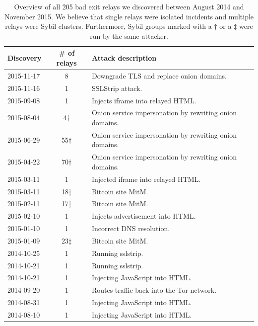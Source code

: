 \begin{table}[t]
\centering
\begin{tabular}{l c p{4cm}}
\textbf{Discovery} & \textbf{\# of relays} & \textbf{Attack description} \\
\hline
2015-11-17 & 8 & Downgrade TLS and replace onion domains. \\
2015-11-16 & 1 & SSLStrip attack. \\
2015-09-08 & 1 & Injects iframe into relayed HTML. \\
2015-08-04 & 4$\dagger$ & Onion service impersonation by rewriting onion domains. \\
2015-06-29 & 55$\dagger$ & Onion service impersonation by rewriting onion domains. \\
2015-04-22 & 70$\dagger$ & Onion service impersonation by rewriting onion domains. \\
2015-03-11 & 1 & Injected iframe into relayed HTML. \\
2015-03-11 & 18$\ddagger$ & Bitcoin site MitM. \\
2015-02-11 & 17$\ddagger$ & Bitcoin site MitM. \\
2015-02-10 & 1 & Injects advertisement into HTML. \\
2015-01-10 & 1 & Incorrect DNS resolution. \\
2015-01-09 & 23$\ddagger$ & Bitcoin site MitM. \\
2014-10-25 & 1 & Running sslstrip. \\
2014-10-21 & 1 & Running sslstrip. \\
2014-10-21 & 1 & Injecting JavaScript into HTML. \\
2014-09-20 & 1 & Routes traffic back into the Tor network. \\
2014-08-31 & 1 & Injecting JavaScript into HTML. \\
2014-08-10 & 1 & Injecting JavaScript into HTML. \\
\end{tabular}
\caption{Overview of all 205 bad exit relays we discovered between August 2014
	and November 2015.  We believe that single relays were isolated incidents
	and multiple relays were Sybil clusters.  Furthermore, Sybil groups marked
	with a $\dagger$ or a $\ddagger$ were run by the same attacker.}
\label{tab:exitmap-dataset}
\end{table}

